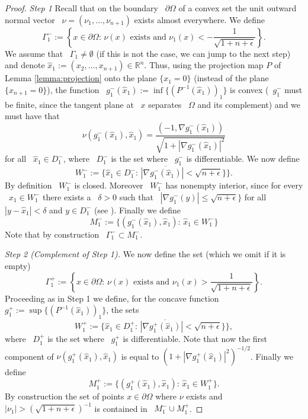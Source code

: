 \documentclass[reqno,12pt]{amsart}
\newcommand{\widex}{\widehat{x}}
\newcommand{\R}{\mathbb{R}}
\numberwithin{equation}{section}
\theoremstyle{plain}
\theoremstyle{definition}
\renewcommand{\leq}{\leqslant}
\begin{document}
\begin{proof}
\textit{Step 1} Recall that on the boundary ~$\partial\Omega$ of a convex set the unit outward normal vector ~$\nu=(\nu_1,\ldots,\nu_{n+1})$ exists almost everywhere. We define 
$$
  \Gamma_1^-:=\left\{x\in\partial\Omega:\,\nu(x)\text{ exists and }\nu_1(x)< -\frac{1}{\sqrt{1+n+\epsilon}}\right\}.
$$
We assume that ~$\Gamma_1\neq \emptyset$ (if this is not the case, we can jump to the next step) and denote $\widehat{x}_1:=(x_2,\ldots,x_{n+1})\in \R^n$. Thus, using the projection map $P$ of Lemma \ref{lemma:projection} onto the plane $\{x_1=0\}$ (instead of the plane $\{x_{n+1}=0\}$),  the function ~$g_1^-(\widehat{x}_1):=\inf\{(P^{-1}(\widehat{x}_1))_1\}$ is convex (~$g_1^-$ must be finite, since the tangent plane at ~$x$ separates ~$\Omega$ and its complement) and we must have that
$$
  \nu(g_1^-(\widehat{x}_1),\widehat{x}_1)=\frac{(-1,\nabla g_1^-(\widex_1)   )}{\sqrt{1+|\nabla g_1^-(\widex_1)|^2}}
$$
for all ~$\widex_1\in D_1^-$, where ~$D_1^-$ is the set where ~$g_1^-$ is differentiable. We now define 
$$
  W_1^-:=\overline{\{\widex_1\in D_1^-:\,|\nabla g_1^-(\widex_1)|< \sqrt{n+\epsilon}\}\}}.
$$
By definition ~$W_1^-$ is closed. Moreover ~$W_1^-$ has nonempty interior, since for every ~$\widex_1\in W_1^-$ there exists a ~$\delta>0$ such that ~$|\nabla g_1^-(y)|\leq \sqrt{n+\epsilon}\}$ for all ~$|y-\widex_1|<\delta$ and  $y\in D_1^-$  (see \cite[Theorem 25.5, page 246]{Rockafellar}). 
Finally we define
$$
  M_1^-:=\{(g_1^-(\widex_1),\widex_1):\, \widehat{x}_1\in W_1^-\}
$$
Note that by construction ~$\Gamma_1^-\subset M_1^-$.

\smallskip

\textit{Step 2 (Complement of Step 1).} We now define the set (which we omit if it is empty) 
$$
  \Gamma_1^+:=\left\{x\in\partial\Omega:\,\nu(x)\text{ exists and }\nu_1(x)> \frac{1}{\sqrt{1+n+\epsilon}}\right\}.
$$
Proceeding as in Step 1 we define, for the concave function ~$g_1^+:=\sup\{(P^{-1}(\widehat{x}_1))_1\}$, the sets
$$
  W_1^+:=\overline{\{\widex_1\in D_1^+:\,|\nabla g_1^+(\widex_1)|< \sqrt{n+\epsilon}\}\}},
$$
where ~$D_1^+$ is the set where ~$g_1^+$ is differentiable. 
Note that now the first component of $\nu(g_1^+(\widex_1),\widex_1)$ is equal to $(1+|\nabla g_1^+(\widex_1)|^2)^{-1/2}$.
Finally we define 
$$
  M_1^+:=\{(g_1^+(\widex_1),\widex_1):\, \widehat{x}_1\in W_1^+\}.
$$
By construction the set of points $x\in\partial\Omega$ where $\nu$ exists and ~$|\nu_1|>(\sqrt{1+n+\epsilon})^{-1}$ is contained in ~$M_1^-\cup M_1^+$.
\smallskip


\end{proof}
\end{document}
